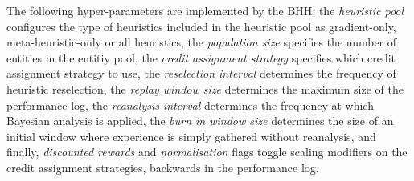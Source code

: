 The following hyper-parameters are implemented by the \acs{BHH}: the \textit{heuristic pool} configures the type of heuristics included in the heuristic pool as gradient-only, meta-heuristic-only or all heuristics, the \textit{population size} specifies the number of entities in the entitiy pool, the \textit{credit assignment strategy} specifies which credit assignment strategy to use, the \textit{reselection interval} determines the frequency of heuristic reselection, the \textit{replay window size} determines the maximum size of the performance log, the \textit{reanalysis interval} determines the frequency at which Bayesian analysis is applied, the \textit{burn in window size} determines the size of an initial window where experience is simply gathered without reanalysis, and finally, \textit{discounted rewards} and \textit{normalisation} flags toggle scaling modifiers on the credit assignment strategies, backwards in the performance log.
